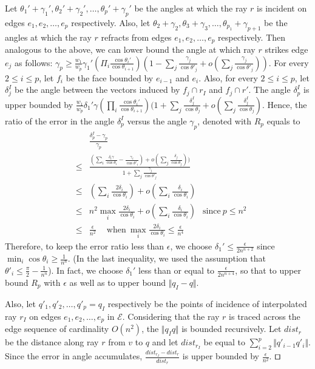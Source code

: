 \documentclass[11pt]{article}
\def\qed{\hbox{\rlap{$\sqcap$}$\sqcup$}}
\def\calE{\mathcal{E}}
\newenvironment{proof}{\par\noindent{\bf Proof:}}{\mbox{}\hfill$\qed$\\}
\begin{document}
\begin{proof}
Let $\theta_1'+\gamma_1', \theta_2'+\gamma_2', \ldots, \theta_{p}'+\gamma_{p}'$ be the angles at which the ray $r$ is incident on edges $e_1, e_2, \ldots, e_{p}$ respectively.
Also, let $\theta_2+\gamma_2, \theta_3+\gamma_3, \ldots, \theta_{p_1}+\gamma_{p+1}$ be the angles at which the ray $r$ refracts from edges $e_1, e_2, \ldots, e_p$ respectively.
Then analogous to the above, we can lower bound the angle at which ray $r$ strikes edge $e_j$ as follows: 
$\gamma_p \ge \frac{w_1}{w_p} \gamma_1' (\Pi_i\frac{\cos\theta_i'}{\cos\theta_{i+1}})
(1-\sum_j\frac{\gamma_j}{\cos\theta'_j} + o(\sum_j\frac{\gamma_j}{\cos\theta'_j}))$.
For every $2 \le i \le p$, let $f_i$ be the face bounded by $e_{i-1}$ and $e_i$.
Also, for every $2 \le i \le p$, let $\delta_j^I$ be the angle between the vectors induced by $f_j \cap r_I$ and $f_j \cap r'$.
The angle $\delta_p^I$ is upper bounded by 
$\frac{w_1}{w_p} \delta_1' \gamma(\prod_i
\frac{\cos\theta_i'}{\cos\theta_{i+1}})
(1+\sum_j\frac{\delta^I_j}{\cos\theta_j} +
o(\sum_j \frac{\delta^I_j}{\cos\theta_j})$.
Hence, the ratio of the  error in the angle $\delta^I_p$ versus the angle $\gamma_p$, denoted with $R_p$ equals to  
\begin{eqnarray*}
& & \frac{\delta^I_p - \gamma_p}{\gamma_p} \\ 
&\le& \frac{(\sum_i \frac{\delta_i\gamma}{\cos\theta_i}- \frac{\gamma_i}{\cos\theta'_i}) +
o(\sum_j\frac{\delta_j}{\cos\theta_j}  ))}{1+\sum_j
\frac{\gamma_j}{\cos\theta'_j}}  \\
&\le& (\sum_i \frac{2\delta_i}{\cos\theta_i}) + o(\sum_i
\frac{\delta_i}{\cos\theta_i})  \\
&\le& n^2 \max_i \frac{2\delta_i}{\cos{\theta_i}} + o(\sum_i
\frac{\delta_i}{\cos\theta_i}) \  \   \mbox{ since}  \ p \leq n^2\\
&\le& \frac{\epsilon}{n^2} \quad  \   \mbox{when}   \  \max_i \frac{2\delta_i}{\cos{\theta_i}} \le
\frac{\epsilon}{n^4}
\end{eqnarray*}
Therefore, to keep the error ratio less than $\epsilon$, we choose $\delta_1' \le \frac{\epsilon}{2n^{n+2}}$ since $\min_i \cos{\theta_i} \geq \frac{1}{n^n}$. 
(In the last inequality, we used the assumption that $\theta'_{i} \leq \frac{\pi}{2} - \frac{1}{n^n}$).
In fact, we choose $\delta_1'$ less than or equal to $\frac{\epsilon}{2n^{n+4}}$, so that to upper bound $R_p$ with $\epsilon$ as well as to upper bound $\Vert q_I-q \Vert$.

Also, let $q'_1, q'_2, \ldots, q'_p=q_I$ respectively be the points of incidence of interpolated ray $r_I$ on edges $e_1, e_2, \ldots, e_p$ in $\calE$.
Considering that the ray $r$ is traced across the edge sequence of cardinality $O(n^2)$, the $\Vert q_Iq \Vert$ is bounded recursively.
Let $dist_r$ be the distance along ray $r$ from $v$ to $q$ and let $dist_{r_I}$ be equal to $\sum_{i=2}^{p} \Vert q'_{i-1}q'_i \Vert$.
Since the error in angle accumulates, $\frac{dist_{r_I} - dist_r}{dist_r}$ is upper bounded by $\frac{\epsilon}{n^2}$.
\end{proof}
\end{document}
